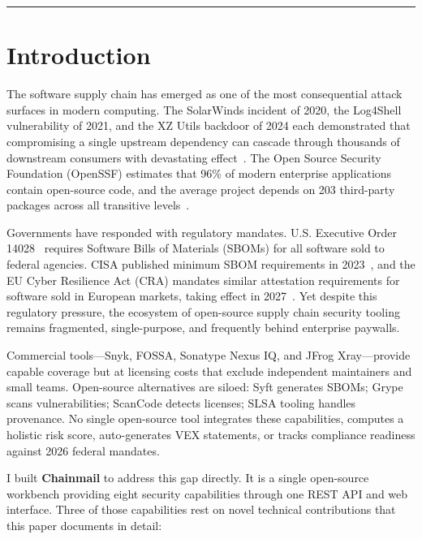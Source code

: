 \documentclass[11pt,twocolumn]{article}
\begin{document}
\bigskip\hrule\bigskip

\section{Introduction}

The software supply chain has emerged as one of the most consequential attack
surfaces in modern computing. The SolarWinds incident of 2020, the Log4Shell
vulnerability of 2021, and the XZ Utils backdoor of 2024 each demonstrated that
compromising a single upstream dependency can cascade through thousands of
downstream consumers with devastating effect~\cite{peisert2021,chen2022log4shell,binsalleeh2024xz}.
The Open Source Security Foundation (OpenSSF) estimates that 96\% of modern
enterprise applications contain open-source code, and the average project depends
on 203 third-party packages across all transitive levels~\cite{openssf2024}.

Governments have responded with regulatory mandates. U.S. Executive Order
14028~\cite{eo14028} requires Software Bills of Materials (SBOMs) for all
software sold to federal agencies. CISA published minimum SBOM requirements in
2023~\cite{cisa2023sbom}, and the EU Cyber Resilience Act (CRA) mandates similar
attestation requirements for software sold in European markets, taking effect in
2027~\cite{eu2024cra}. Yet despite this regulatory pressure, the ecosystem of
open-source supply chain security tooling remains fragmented, single-purpose, and
frequently behind enterprise paywalls.

Commercial tools---Snyk, FOSSA, Sonatype Nexus IQ, and JFrog Xray---provide
capable coverage but at licensing costs that exclude independent maintainers and
small teams. Open-source alternatives are siloed: Syft generates SBOMs; Grype
scans vulnerabilities; ScanCode detects licenses; SLSA tooling handles
provenance. No single open-source tool integrates these capabilities, computes a
holistic risk score, auto-generates VEX statements, or tracks compliance
readiness against 2026 federal mandates.

I built \textbf{Chainmail} to address this gap directly. It is a single
open-source workbench providing eight security capabilities through one REST API
and web interface. Three of those capabilities rest on novel technical
contributions that this paper documents in detail:
\end{document}
